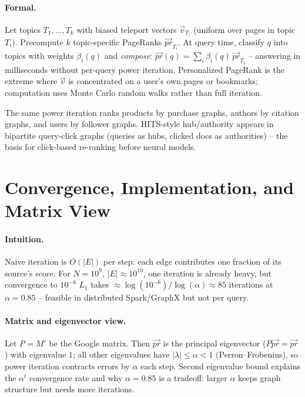 \paragraph{Formal.} Let topics $T_1,\dots,T_k$ with biased teleport vectors $\vec{v}_{T_i}$ (uniform over pages in topic $T_i$). Precompute $k$ topic-specific PageRanks $\vec{pr}_{T_i}$. At query time, classify $q$ into topics with weights $\beta_i(q)$ and \emph{compose}: $\vec{pr}(q)=\sum_i\beta_i(q)\,\vec{pr}_{T_i}$ -- answering in milliseconds without per-query power iteration. Personalized PageRank is the extreme where $\vec{v}$ is concentrated on a user's own pages or bookmarks; computation uses Monte Carlo random walks rather than full iteration.

\begin{remark}
The same power iteration ranks products by purchase graphs, authors by citation graphs, and users by follower graphs. HITS-style hub/authority appears in bipartite query-click graphs (queries as hubs, clicked docs as authorities) -- the basis for click-based re-ranking before neural models.
\end{remark}


\section{Convergence, Implementation, and Matrix View}\label{sec:convergence}
\paragraph{Intuition.} Naive iteration is $O(|E|)$ per step: each edge contributes one fraction of its source's score. For $N=10^9$, $|E|\approx10^{10}$, one iteration is already heavy, but convergence to $10^{-6}$ $L_1$ takes $\approx \log(10^{-6})/\log(\alpha)\approx 85$ iterations at $\alpha=0.85$ -- feasible in distributed Spark/GraphX but not per query.

\paragraph{Matrix and eigenvector view.} Let $P=M'$ be the Google matrix. Then $\vec{pr}$ is the principal eigenvector ($P\vec{pr}=\vec{pr}$) with eigenvalue $1$; all other eigenvalues have $|\lambda|\le\alpha<1$ (Perron--Frobenius), so power iteration contracts errors by $\alpha$ each step. Second eigenvalue bound explains the $\alpha^t$ convergence rate and why $\alpha=0.85$ is a tradeoff: larger $\alpha$ keeps graph structure but needs more iterations.

